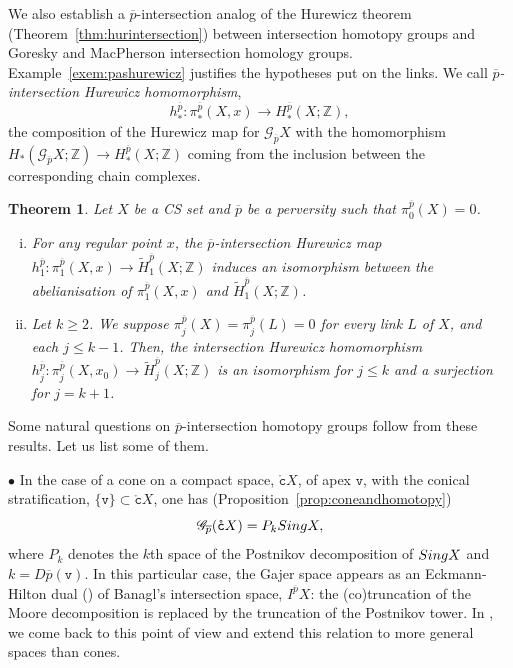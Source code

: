 \documentclass[a4paper,10pt,english,reqno]{amsart}
\theoremstyle{plain}
\newtheorem{theorem}{Theorem}
\theoremstyle{definition}
\theoremstyle{remark}
\numberwithin{equation}{section}
\newcommand{\thmref}[1]{Theorem~\ref{#1}}
\newcommand{\propref}[1]{Proposition~\ref{#1}}
\newcommand{\exemref}[1]{Example~\ref{#1}}
\def\ov{\overline}
\def\crG{{\mathscr G}}
\def\tc{{\mathtt c}}
\def\tv{{\mathtt v}}
\def\Z{\mathbb{Z}}
\def\sing{{\rm Sing}}
\def\rc{{\mathring{\tc}}}
\renewcommand\1{\hbox{\ding{192}}}
\renewcommand\2{\hbox{\ding{193}}}
\newcommand\3{\hbox{\ding{194}}}
\newcommand\4{\hbox{\ding{195}}}
\begin{document}
%
We also establish a $\ov{p}$-intersection analog of the Hurewicz theorem 
(\thmref{thm:hurintersection}) between intersection homotopy groups and Goresky and MacPherson intersection homology groups.
 \exemref{exem:pashurewicz}   justifies the hypotheses put on the links.
 We call \emph{$\ov{p}$-intersection Hurewicz homomorphism}, 
 $$h^{\ov{p}}_{*}\colon \pi^{\ov{p}}_{*}(X,x)\to H_{*}^{\ov{p}}(X;\Z),$$
 the composition of the Hurewicz map for $\crG_{\ov{p}}X$ with the homomorphism 
 $H_{*}(\crG_{\ov{p}}X;\Z)\to H_{*}^{\ov{p}}(X;\Z)$ coming 
 from  the inclusion between the corresponding chain complexes.
 
 

\begin{theorem}\label{thm:HureIntersectionHomotopyHomologyintro}
Let $X$ be a  CS set and $\ov{p}$ be a perversity such that $\pi_{0}^{\ov{p}}(X)=0$.
\begin{enumerate}[i)]
%
%
\item For any regular point $x$, the $\ov{p}$-intersection Hurewicz map 
$h^{\ov{p}}_{1}\colon \pi^{\ov{p}}_{1}(X,x)\to \widetilde{H}_{1}^{\ov{p}}(X;\Z)$
% 
induces an isomorphism between the abelianisation of $\pi_{1}^{\ov{p}}(X,x)$ and $\widetilde{H}_{1}^{\ov{p}}(X;\Z)$.
%
\item
Let $k\geq 2$. 
%
 We suppose  
$\pi_{j}^{\ov{p}}(X)=\pi_{j}^{\ov p}(L)=0$ for every link  $L$ of $X$, and each $j\leq k-1$.
Then, the intersection Hurewicz homomorphism
$h_{j}^{\ov{p}}\colon \pi_{j}^{\ov{p}}(X,x_{0})\to \widetilde{H}_{j}^{\ov{p}}(X;\Z)$
 is an isomorphism for $j\leq k$ and a surjection for $j=k+1$.
%
\end{enumerate}
\end{theorem}

Some natural questions on $\ov{p}$-intersection homotopy groups follow from these results. 
Let us list some of them.

\smallskip $\bullet$
In the case of a cone on a compact space, $\rc X$, of apex $\tv$, 
with the conical stratification, $\{\tv\}\subset \rc X$, one has (\propref{prop:coneandhomotopy})
$$\crG_{\ov{p}}  (\rc X)=P_{k}\sing X,$$
where $P_{k}$ denotes the $k$th space of the Postnikov decomposition of $\sing X$
and $k=D\ov{p}(\tv)$. In this particular case,
the Gajer space appears as an Eckmann-Hilton dual (\cite[Section 4.H]{MR1867354})
of Banagl's intersection space, $I^{\ov{p}}X$: 
the (co)truncation of the  Moore decomposition is replaced by the truncation of the Postnikov tower.
%
%
In \cite{CST10}, we  come back to this point of view  and extend this relation to more general spaces than cones.
%
\end{document}
